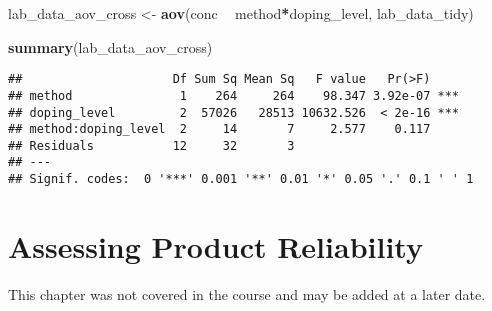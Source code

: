 \documentclass[]{book}
\newenvironment{Shaded}{\begin{snugshade}}{\end{snugshade}}
\newcommand{\KeywordTok}[1]{\textcolor[rgb]{0.13,0.29,0.53}{\textbf{#1}}}
\newcommand{\NormalTok}[1]{#1}
\newcommand{\OperatorTok}[1]{\textcolor[rgb]{0.81,0.36,0.00}{\textbf{#1}}}
\newcommand{\StringTok}[1]{\textcolor[rgb]{0.31,0.60,0.02}{#1}}
\theoremstyle{definition}
\theoremstyle{definition}
\theoremstyle{definition}
\theoremstyle{remark}
\begin{document}
\begin{Shaded}
\begin{Highlighting}[]
\NormalTok{lab_data_aov_cross <-}\StringTok{ }\KeywordTok{aov}\NormalTok{(conc }\OperatorTok{~}\StringTok{ }\NormalTok{method}\OperatorTok{*}\NormalTok{doping_level, lab_data_tidy)}

\KeywordTok{summary}\NormalTok{(lab_data_aov_cross)}
\end{Highlighting}
\end{Shaded}

\begin{verbatim}
##                     Df Sum Sq Mean Sq   F value   Pr(>F)    
## method               1    264     264    98.347 3.92e-07 ***
## doping_level         2  57026   28513 10632.526  < 2e-16 ***
## method:doping_level  2     14       7     2.577    0.117    
## Residuals           12     32       3                       
## ---
## Signif. codes:  0 '***' 0.001 '**' 0.01 '*' 0.05 '.' 0.1 ' ' 1
\end{verbatim}

\hypertarget{assessing-product-reliability}{%
\chapter{Assessing Product
Reliability}\label{assessing-product-reliability}}

This chapter was not covered in the course and may be added at a later
date.


\end{document}
